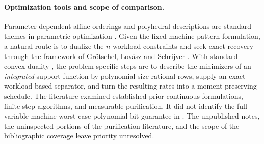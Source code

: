 \paragraph{Optimization tools and scope of comparison.}
Parameter-dependent affine orderings and polyhedral descriptions are standard themes in parametric optimization \cite{nemesch2025}. Given the fixed-machine pattern formulation, a natural route is to dualize the $n$ workload constraints and seek exact recovery through the framework of Gr\"otschel, Lov\'asz and Schrijver \cite{gls1988}. With standard convex duality \cite{rockafellar1970}, the problem-specific steps are to describe the minimizers of an \emph{integrated} support function by polynomial-size rational rows, supply an exact workload-based separator, and turn the resulting rates into a moment-preserving schedule. The literature examined established prior continuous formulations, finite-step algorithms, and measurable purification. It did not identify the full variable-machine worst-case polynomial bit guarantee in . The unpublished notes, the uninspected portions of the purification literature, and the scope of the bibliographic coverage leave priority unresolved.
